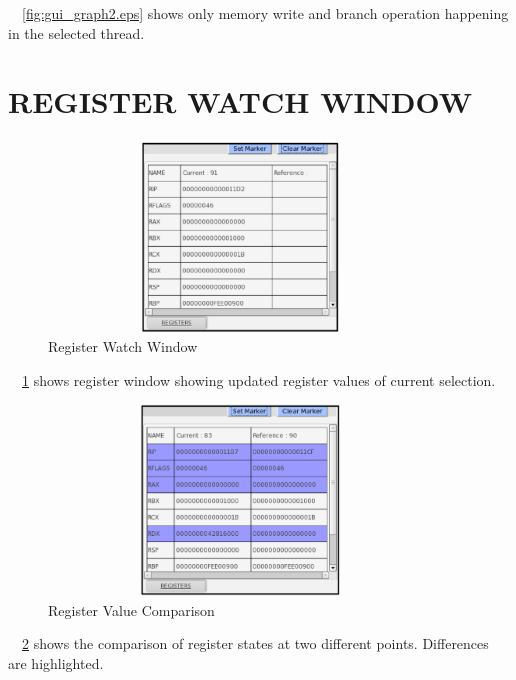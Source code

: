 ~\figurename{~\ref{fig:gui_graph2.eps}} shows only memory write and branch operation happening in the selected thread.
\section {REGISTER WATCH WINDOW}
\begin{figure}[H]
\centering
\includegraphics[width=4in, height=2in]{./figures/gui_reg1.eps}
\caption{Register Watch Window}
\label{fig:gui_reg1.eps}
\end{figure}
~\figurename{~\ref{fig:gui_reg1.eps}} shows register window showing updated register values of current selection.
\begin{figure}[H]
\centering
\includegraphics[width=4in, height=2in]{./figures/gui_reg2.eps}
\caption{Register Value Comparison}
\label{fig:gui_reg2.eps}
\end{figure}
~\figurename{~\ref{fig:gui_reg2.eps}} shows the comparison of register states at two different points. Differences are highlighted.
